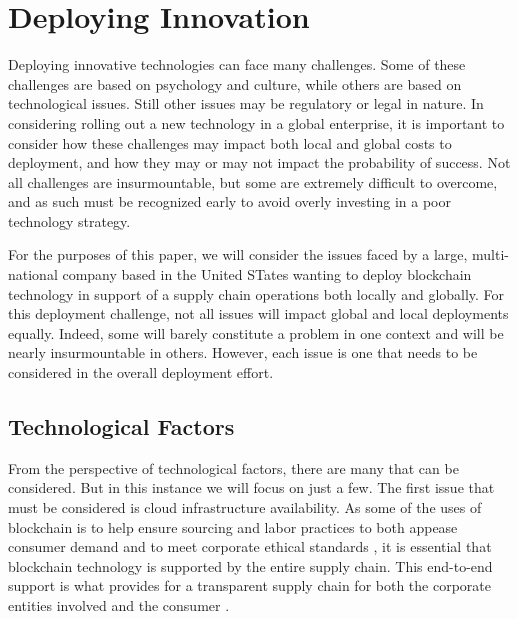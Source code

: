 \section{Deploying Innovation}

Deploying innovative technologies can face many challenges. Some of these challenges are based on psychology and culture, while others are based on technological issues. Still other issues may be regulatory or legal in nature. In considering rolling out a new technology in a global enterprise, it is important to consider how these challenges may impact both local and global costs to deployment, and how they may or may not impact the probability of success. Not all challenges are insurmountable, but some are extremely difficult to overcome, and as such must be recognized early to avoid overly investing in a poor technology strategy.

For the purposes of this paper, we will consider the issues faced by a large, multi-national company based in the United STates wanting to deploy blockchain technology in support of a supply chain operations both locally and globally. For this deployment challenge, not all issues will impact global and local deployments equally. Indeed, some will barely constitute a problem in one context and will be nearly insurmountable in others. However, each issue is one that needs to be considered in the overall deployment effort.

\subsection{Technological Factors}

From the perspective of technological factors, there are many that can be considered. But in this instance we will focus on just a few. The first issue that must be considered is cloud infrastructure availability. As some of the uses of blockchain is to help ensure sourcing and labor practices to both appease consumer demand and to meet corporate ethical standards \parencite{kouhizadehBlockchainTechnologySustainable2021,saberiBlockchainTechnologyIts2019}, it is essential that blockchain technology is supported by the entire supply chain. This end-to-end support is what provides for a transparent supply chain for both the corporate entities involved and the consumer \parencite{gaurBuildingTransparentSupply2020a}.

